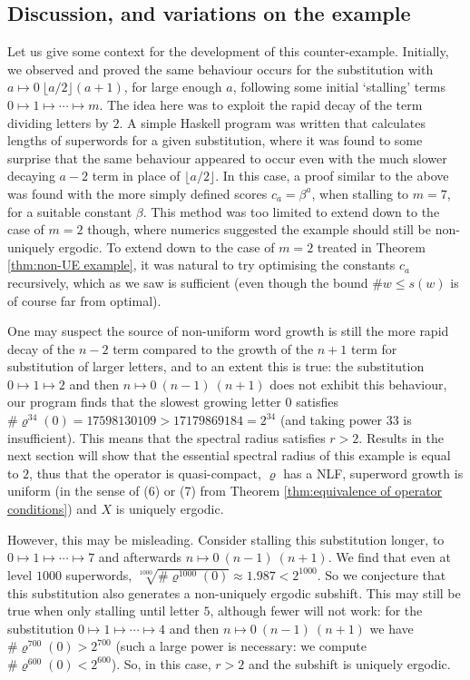 \documentclass[11pt]{amsart}
\numberwithin{equation}{section}
\theoremstyle{plain}
\theoremstyle{definition}
\newcommand{\sub}{\varrho}
\begin{document}
\subsection{Discussion, and variations on the example} \label{sec:counterexample discussion}
Let us give some context for the development of this counter-example. Initially, we observed and proved the same behaviour occurs for the substitution with \(a \mapsto 0 \ \lfloor a/2 \rfloor (a+1)\), for large enough \(a\), following some initial `stalling' terms \(0 \mapsto 1 \mapsto \cdots \mapsto m\). The idea here was to exploit the rapid decay of the term dividing letters by \(2\). A simple Haskell program was written that calculates lengths of superwords for a given substitution, where it was found to some surprise that the same behaviour appeared to occur even with the much slower decaying \(a-2\) term in place of \(\lfloor a/2 \rfloor\). In this case, a proof similar to the above was found with the more simply defined scores \(c_a = \beta^a\), when stalling to \(m = 7\), for a suitable constant \(\beta\). This method was too limited to extend down to the case of \(m=2\) though, where numerics suggested the example should still be non-uniquely ergodic. To extend down to the case of \(m=2\) treated in Theorem \ref{thm:non-UE example}, it was natural to try optimising the constants \(c_a\) recursively, which as we saw is sufficient (even though the bound \(\# w \leq s(w)\) is of course far from optimal).

One may suspect the source of non-uniform word growth is still the more rapid decay of the \(n-2\) term compared to the growth of the \(n+1\) term for substitution of larger letters, and to an extent this is true: the substitution \(0 \mapsto 1 \mapsto 2\) and then \(n \mapsto 0 \ (n-1) \ (n+1)\) does not exhibit this behaviour, our program finds that the slowest growing letter \(0\) satisfies \(\# \sub^{34}(0) = 17598130109 > 17179869184 = 2^{34}\) (and taking power \(33\) is insufficient). This means that the spectral radius satisfies \(r > 2\). Results in the next section will show that the essential spectral radius of this example is equal to \(2\), thus that the operator is quasi-compact, \(\sub\) has a NLF, superword growth is uniform (in the sense of (6) or (7) from Theorem \ref{thm:equivalence of operator conditions}) and \(X\) is uniquely ergodic.

However, this may be misleading. Consider stalling this substitution longer, to \(0 \mapsto 1 \mapsto \cdots \mapsto 7\) and afterwards \(n \mapsto 0 \ (n-1) \ (n+1)\). We find that even at level \(1000\) superwords, \(\sqrt[1000]{\# \sub^{1000}(0)} \approx 1.987 < 2^{1000}\). So we conjecture that this substitution also generates a non-uniquely ergodic subshift. This may still be true when only stalling until letter \(5\), although fewer will not work: for the substitution \(0 \mapsto 1 \mapsto \cdots \mapsto 4\) and then \(n \mapsto 0 \ (n-1) \ (n+1)\) we have \(\# \sub^{700}(0) > 2^{700}\) (such a large power is necessary: we compute \(\# \sub^{600}(0) < 2^{600}\)). So, in this case, \(r > 2\) and the subshift is uniquely ergodic.
\end{document}
